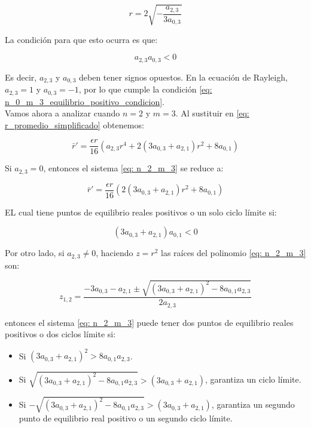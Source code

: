 \begin{equation}\label{eq: n_0_m_3_equilibrio_positivo}
	r=2\sqrt{-\frac{a_{2,3}}{3a_{0,3}}}
\end{equation}

La condición para que esto ocurra es que:

\begin{equation}\label{eq: n_0_m_3_equilibrio_positivo_condicion}
	a_{2,3}a_{0,3}<0
\end{equation}

Es decir, $a_{2,3}$ y $a_{0,3}$ deben tener signos opuestos. En la ecuación de Rayleigh, $a_{2,3}=1$ y $a_{0,3}=-1$, por lo que cumple la condición \eqref{eq: n_0_m_3_equilibrio_positivo_condicion}.\\

Vamos ahora a analizar cuando $n=2$ y $m=3$. Al sustituir en \eqref{eq: r_promedio_simplificado} obtenemos:

\begin{equation}\label{eq: n_2_m_3}
	\bar{r}'=\frac{\epsilon r}{16}\left(a_{2,3}r^4+2\left(3a_{0,3}+a_{2,1}\right)r^2+8a_{0,1}\right)
\end{equation}

Si $a_{2,3}=0$, entonces el sistema \eqref{eq: n_2_m_3} se reduce a:

\begin{equation}\label{eq: n_2_m_3_a_2_3_0}
	\bar{r}'=\frac{\epsilon r}{16}\left(2\left(3a_{0,3}+a_{2,1}\right)r^2+8a_{0,1}\right)
\end{equation}

EL cual tiene puntos de equilibrio reales positivos o un solo ciclo límite si:

\begin{equation}\label{eq: n_2_m_3_a_2_3_0_equilibrio_positivo}
	\left(3a_{0,3}+a_{2,1}\right)a_{0,1}<0
\end{equation}

Por otro lado, si $a_{2,3}\neq 0$, haciendo $z=r^2$ las raíces del polinomio \eqref{eq: n_2_m_3} son:

\begin{equation}\label{eq: n_2_m_3_raices}
	z_{1,2}=\frac{-3a_{0,3}-a_{2,1}\pm\sqrt{\left(3a_{0,3}+a_{2,1}\right)^2-8a_{0,1}a_{2,3}}}{2a_{2,3}}
\end{equation}

entonces el sistema \eqref{eq: n_2_m_3} puede tener dos puntos de equilibrio reales positivos o dos ciclos límite si:

\begin{itemize}
	\item Si $\left(3a_{0,3}+a_{2,1}\right)^2>8a_{0,1}a_{2,3}$.
	\item Si $\sqrt{\left(3a_{0,3}+a_{2,1}\right)^2-8a_{0,1}a_{2,3}}>\left(3a_{0,3}+a_{2,1}\right)$, garantiza un ciclo límite.
	\item Si $-\sqrt{\left(3a_{0,3}+a_{2,1}\right)^2-8a_{0,1}a_{2,3}}>\left(3a_{0,3}+a_{2,1}\right)$, garantiza un segundo punto de equilibrio real positivo o un segundo ciclo límite.
\end{itemize}

